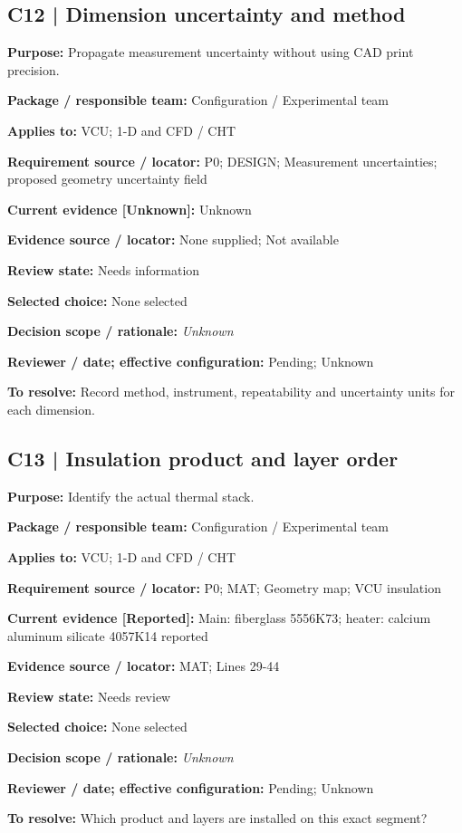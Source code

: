 \documentclass[11pt]{article}
\begin{document}
\begin{minipage}{\textwidth}\small\setlength{\parskip}{2pt}
\subsection*{C12 | Dimension uncertainty and method}
\textbf{Purpose:} Propagate measurement uncertainty without using CAD print precision.\par
\textbf{Package / responsible team:} Configuration / Experimental team\par
\textbf{Applies to:} VCU; 1-D and CFD / CHT\par
\textbf{Requirement source / locator:} P0; DESIGN; Measurement uncertainties; proposed geometry uncertainty field\par
\textbf{Current evidence [Unknown]:} Unknown\par
\textbf{Evidence source / locator:} None supplied; Not available\par
\textbf{Review state:} Needs information\par
\textbf{Selected choice:} None selected\par
\textbf{Decision scope / rationale:} \textit{Unknown}\par
\textbf{Reviewer / date; effective configuration:} Pending; Unknown\par
\textbf{To resolve:} Record method, instrument, repeatability and uncertainty units for each dimension.\par
\end{minipage}\par\vspace{5pt}
\begin{minipage}{\textwidth}\small\setlength{\parskip}{2pt}
\subsection*{C13 | Insulation product and layer order}
\textbf{Purpose:} Identify the actual thermal stack.\par
\textbf{Package / responsible team:} Configuration / Experimental team\par
\textbf{Applies to:} VCU; 1-D and CFD / CHT\par
\textbf{Requirement source / locator:} P0; MAT; Geometry map; VCU insulation\par
\textbf{Current evidence [Reported]:} Main: fiberglass 5556K73; heater: calcium aluminum silicate 4057K14 reported\par
\textbf{Evidence source / locator:} MAT; Lines 29-44\par
\textbf{Review state:} Needs review\par
\textbf{Selected choice:} None selected\par
\textbf{Decision scope / rationale:} \textit{Unknown}\par
\textbf{Reviewer / date; effective configuration:} Pending; Unknown\par
\textbf{To resolve:} Which product and layers are installed on this exact segment?\par
\end{minipage}\par\vspace{5pt}
\end{document}
